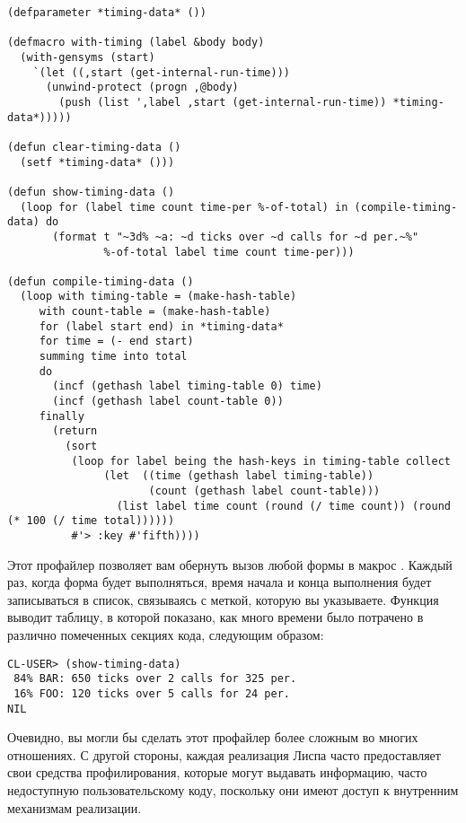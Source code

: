 \begin{lstlisting}
(defparameter *timing-data* ())

(defmacro with-timing (label &body body)
  (with-gensyms (start)
    `(let ((,start (get-internal-run-time)))
      (unwind-protect (progn ,@body)
        (push (list ',label ,start (get-internal-run-time)) *timing-data*)))))

(defun clear-timing-data ()
  (setf *timing-data* ()))

(defun show-timing-data ()
  (loop for (label time count time-per %-of-total) in (compile-timing-data) do
       (format t "~3d% ~a: ~d ticks over ~d calls for ~d per.~%" 
               %-of-total label time count time-per)))

(defun compile-timing-data () 
  (loop with timing-table = (make-hash-table)
     with count-table = (make-hash-table)
     for (label start end) in *timing-data*
     for time = (- end start)
     summing time into total
     do
       (incf (gethash label timing-table 0) time)
       (incf (gethash label count-table 0))
     finally 
       (return
         (sort
          (loop for label being the hash-keys in timing-table collect
               (let  ((time (gethash label timing-table))
                      (count (gethash label count-table)))
                 (list label time count (round (/ time count)) (round (* 100 (/ time total))))))
          #'> :key #'fifth))))
\end{lstlisting}

Этот профайлер позволяет вам обернуть вызов любой формы в макрос
. Каждый раз, когда форма будет выполняться, время начала и конца
выполнения будет записываться в список, связываясь с меткой, которую вы
указываете. Функция  выводит таблицу, в которой показано, как много
времени было потрачено в различно помеченных секциях кода, следующим образом:

\begin{lstlisting}
CL-USER> (show-timing-data)
 84% BAR: 650 ticks over 2 calls for 325 per.
 16% FOO: 120 ticks over 5 calls for 24 per.
NIL
\end{lstlisting}

Очевидно, вы могли бы сделать этот профайлер более сложным во многих отношениях. С другой
стороны, каждая реализация Лиспа часто предоставляет свои средства профилирования, которые
могут выдавать информацию, часто недоступную пользовательскому коду, поскольку они имеют
доступ к внутренним механизмам реализации.

